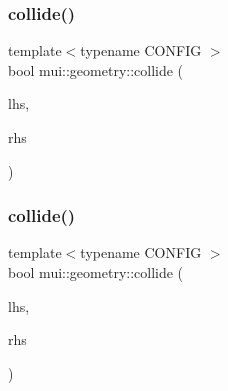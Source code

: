 \mbox{\label{namespacemui_1_1geometry_aad4f6edacb9272973a2206385d991f9b}} 
\subsubsection{\texorpdfstring{collide()}{collide()}\hspace{0.1cm}{\footnotesize\ttfamily [9/10]}}
{\footnotesize\ttfamily template$<$typename C\+O\+N\+F\+IG $>$ \\
bool mui\+::geometry\+::collide (\begin{DoxyParamCaption}\item[{const \hyperlink{classmui_1_1geometry_1_1sphere}{sphere}$<$ C\+O\+N\+F\+IG $>$ \&}]{lhs,  }\item[{const \hyperlink{classmui_1_1geometry_1_1box}{box}$<$ C\+O\+N\+F\+IG $>$ \&}]{rhs }\end{DoxyParamCaption})}

\mbox{\label{namespacemui_1_1geometry_a2325525e89b79f9b8efb6d4169333f32}} 
\subsubsection{\texorpdfstring{collide()}{collide()}\hspace{0.1cm}{\footnotesize\ttfamily [10/10]}}
{\footnotesize\ttfamily template$<$typename C\+O\+N\+F\+IG $>$ \\
bool mui\+::geometry\+::collide (\begin{DoxyParamCaption}\item[{const \hyperlink{classmui_1_1geometry_1_1box}{box}$<$ C\+O\+N\+F\+IG $>$ \&}]{lhs,  }\item[{const \hyperlink{classmui_1_1geometry_1_1box}{box}$<$ C\+O\+N\+F\+IG $>$ \&}]{rhs }\end{DoxyParamCaption})}

\mbox{\label{namespacemui_1_1geometry_a969b82522c35db6b6b89959cd74e4b6b}} 
